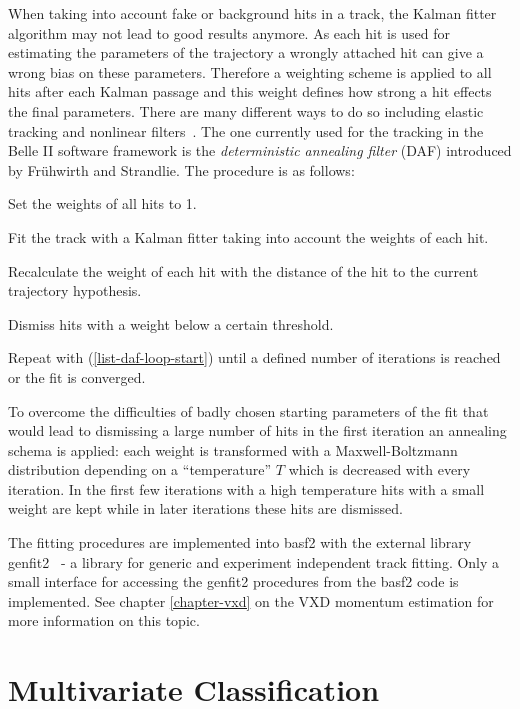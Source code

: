 When taking into account fake or background hits in a track, the Kalman fitter algorithm may not lead to good results anymore. As each hit is used for estimating the parameters of the trajectory a wrongly attached hit can give a wrong bias on these parameters. Therefore a weighting scheme is applied to all hits after each Kalman passage and this weight defines how strong a hit effects the final parameters. There are many different ways to do so including elastic tracking and nonlinear filters~\cite{daf_fruh}. The one currently used for the tracking in the Belle II software framework is the \emph{deterministic annealing filter} (DAF) introduced by Frühwirth and Strandlie. The procedure is as follows:
\begin{zlist}
  \item Set the weights of all hits to 1.
  \item Fit the track with a Kalman fitter taking into account the weights of each hit. \label{list-daf-loop-start}
  \item Recalculate the weight of each hit with the distance of the hit to the current trajectory hypothesis.
  \item Dismiss hits with a weight below a certain threshold.
  \item Repeat with (\ref{list-daf-loop-start}) until a defined number of iterations is reached or the fit is converged.
\end{zlist}

To overcome the difficulties of badly chosen starting parameters of the fit that would lead to dismissing a large number of hits in the first iteration an annealing schema is applied: each weight is transformed with a Maxwell-Boltzmann distribution depending on a ``temperature'' $T$ which is decreased with every iteration. In the first few iterations with a high temperature hits with a small weight are kept while in later iterations these hits are dismissed.

The fitting procedures are implemented into basf2 with the external library genfit2~\cite{genfit} - a library for generic and experiment independent track fitting. Only a small interface for accessing the genfit2 procedures from the basf2 code is implemented. See chapter \ref{chapter-vxd} on the VXD momentum estimation for more information on this topic.

\section{Multivariate Classification}

